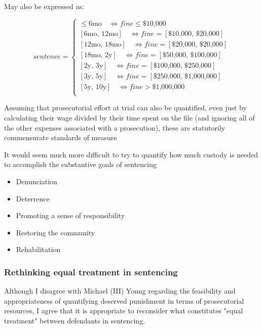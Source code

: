 May also be expressed as:

\begin{equation*}
		  sentence = \begin{cases}
		             \le \text{6mo} \quad  \iff fine \le \text{\$10,000} \\
		            [\text{6mo, 12mo}] \quad \iff fine = [\text{\$10,000, \$20,000}]\\
		            [\text{12mo, 18mo}] \quad \iff fine = [\text{\$20,000, \$20,000}]\\
		            [\text{18mo, 2y}] \quad \iff fine = [\text{\$50,000, \$100,000}]\\
		            [\text{2y, 3y}] \quad \iff fine = [\text{\$100,000, \$250,000}]\\
		            [\text{3y, 5y}] \quad \iff fine = [\text{\$250,000, \$1,000,000}]\\
		            [\text{5y, 10y}] \quad \iff fine > \text{\$1,000,000}\\
		       \end{cases}
		  \end{equation*}

Assuming that prosecutorial effort at trial can also be quantified, even just by calculating their wage divided by their time spent on the file (and ignoring all of the other expenses associated with a prosecution), these are statutorily commensurate standards of measure

It would seem much more difficult to try to quantify how much custody is needed to accomplish the substantive goals of sentencing
\begin{itemize}
    \item Denunciation
    \item Deterrence
    \item Promoting a sense of responsibility
    \item Restoring the community
    \item Rehabilitation
\end{itemize}

\subsubsection{Rethinking equal treatment in sentencing}

Although I disagree with Michael (III) Young regarding the feasibility and appropriateness of quantifying deserved punishment in terms of prosecutorial resources, I agree that it is appropriate to reconsider what constitutes "equal treatment" between defendants in sentencing.

